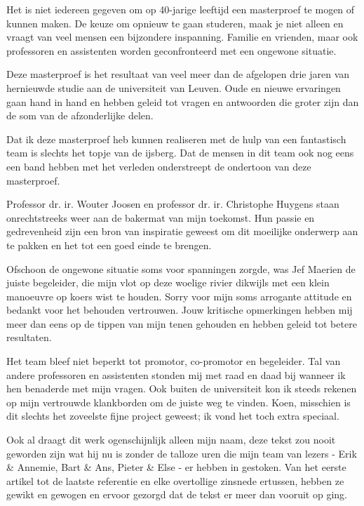 
\begin{preface}

Het is niet iedereen gegeven om op 40-jarige leeftijd een masterproef te mogen
of kunnen maken. De keuze om opnieuw te gaan studeren, maak je niet alleen en
vraagt van veel mensen een bijzondere inspanning. Familie en vrienden, maar ook
professoren en assistenten worden geconfronteerd met een ongewone situatie.

Deze masterproef is het resultaat van veel meer dan de afgelopen drie jaren van
hernieuwde studie aan de universiteit van Leuven. Oude en nieuwe ervaringen
gaan hand in hand en hebben geleid tot vragen en antwoorden die groter zijn dan
de som van de afzonderlijke delen.

Dat ik deze masterproef heb kunnen realiseren met de hulp van een fantastisch
team is slechts het topje van de ijsberg. Dat de mensen in dit team ook nog
eens een band hebben met het verleden onderstreept de ondertoon van deze
masterproef.

Professor dr. ir. Wouter Joosen en professor dr. ir. Christophe Huygens staan
onrechtstreeks weer aan de bakermat van mijn toekomst. Hun passie en
gedrevenheid zijn een bron van inspiratie geweest om dit moeilijke onderwerp
aan te pakken en het tot een goed einde te brengen.

Ofschoon de ongewone situatie soms voor spanningen zorgde, was Jef Maerien de
juiste begeleider, die mijn vlot op deze woelige rivier dikwijls met een klein
manoeuvre op koers wist te houden. Sorry voor mijn soms arrogante attitude en
bedankt voor het behouden vertrouwen. Jouw kritische opmerkingen hebben mij
meer dan eens op de tippen van mijn tenen gehouden en hebben geleid tot betere
resultaten.

Het team bleef niet beperkt tot promotor, co-promotor en begeleider. Tal van
andere professoren en assistenten stonden mij met raad en daad bij wanneer ik
hen benaderde met mijn vragen. Ook buiten de universiteit kon ik steeds rekenen
op mijn vertrouwde klankborden om de juiste weg te vinden. Koen, misschien is
dit slechts het zoveelste fijne project geweest; ik vond het toch extra
speciaal.

Ook al draagt dit werk ogenschijnlijk alleen mijn naam, deze tekst zou nooit
geworden zijn wat hij nu is zonder de talloze uren die mijn team van lezers -
Erik \& Annemie, Bart \& Ans, Pieter \& Else - er hebben in gestoken. Van het
eerste artikel tot de laatste referentie en elke overtollige zinsnede ertussen,
hebben ze gewikt en gewogen en ervoor gezorgd dat de tekst er meer dan vooruit
op ging.


\end{preface}
